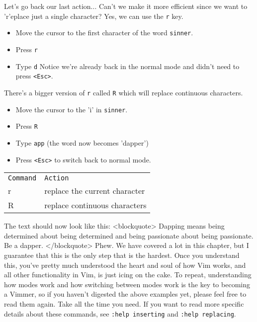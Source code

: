 Let's go back our last action... Can't we make it more efficient since we want to
'r'eplace just a single character? Yes, we can use the \texttt{r} key. 
\begin{itemize}
\item Move the cursor to the first character of the word \texttt{sinner}. 
\item Press \texttt{r} 
\item Type \texttt{d} Notice we're already back in the normal mode and
didn't need to press \texttt{<Esc>}. 
\end{itemize}
There's a bigger version of
\texttt{r} called \texttt{R} which will replace continuous characters. 
\begin{itemize}
\item Move the cursor to the 'i' in \texttt{sinner}. 
\item Press \texttt{R} 
\item Type \texttt{app} (the word now becomes 'dapper') 
\item Press \texttt{<Esc>} to switch back to normal mode. 
\end{itemize}
\begin{tabular}{l l}
\hline 
\texttt{Command} & \texttt{Action} \\  
r & replace the current character \\ 
R & replace continuous characters \\
\hline
\end{tabular}
The text should now look like this: <blockquote> Dapping means being determined
about being determined and being passionate about being passionate. Be a
dapper. </blockquote> Phew. We have covered a lot in this chapter, but I
guarantee that this is the only step that is the hardest. Once you understand
this, you've pretty much understood the heart and soul of how Vim works, and
all other functionality in Vim, is just icing on the cake. To repeat,
understanding how modes work and how switching between modes work is the key to
becoming a Vimmer, so if you haven't digested the above examples yet, please
feel free to read them again. Take all the time you need. If you want to read
more specific details about these commands, see \texttt{:help inserting} and
\texttt{:help replacing}. 


